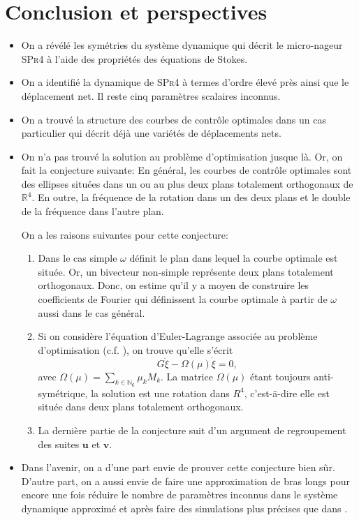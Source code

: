 \documentclass[12pt,a4paper]{article}
\theoremstyle{plain}
\theoremstyle{plain}
\theoremstyle{plain}
\theoremstyle{definition}
\theoremstyle{definition}
\theoremstyle{definition}
\theoremstyle{plain}
\newcommand{\N}{\mathbb{N}}
\newcommand{\R}{\mathbb{R}}
\begin{document}
\section{Conclusion et perspectives}
\begin{itemize}
\item On a révélé les symétries du système dynamique qui décrit le micro-nageur \textsc{SPr4} à l'aide des propriétés des équations de Stokes.

\item On a identifié la dynamique de \textsc{SPr4} à termes d'ordre élevé  près ainsi que le déplacement net. Il reste cinq paramètres scalaires inconnus.

\item On a trouvé la structure des courbes de contrôle optimales dans un cas particulier qui décrit déjà une variétés de déplacements nets.

\item On n'a pas trouvé la solution au problème d'optimisation jusque là. Or, on fait la conjecture suivante: En général, les courbes de contrôle optimales sont des ellipses situées dans un ou au plus deux plans totalement orthogonaux de $\R^4$. En outre, la fréquence de la rotation dans un des deux plans et le double de la fréquence dans l'autre plan.

On a les raisons suivantes pour cette conjecture:
\begin{enumerate}
\item Dans le cas simple $\omega$ définit le plan dans lequel la courbe optimale est située. Or, un bivecteur non-simple représente deux plans totalement orthogonaux. Donc, on estime qu'il y a moyen de construire les coefficients de Fourier qui définissent la courbe optimale à partir de $\omega$ aussi dans le cas général.

\item Si on considère l'équation d'Euler-Lagrange associée au problème d'optimisation (c.f. \cite{DeSimone2011}), on trouve qu'elle s'écrit
\begin{equation}
G \ddot{\xi} - \Omega(\mu) \dot{\xi} = 0,
\end{equation}
avec $\Omega(\mu) = \sum_{k \in \N_6} \mu_k M_k$. La matrice $\Omega(\mu)$ étant toujours anti-symétrique, la solution est une rotation dans $R^4$, c'est-ä-dire elle est située dans deux plans totalement orthogonaux.

\item La dernière partie de la conjecture suit d'un argument de regroupement des suites $\mathbf{u}$ et $\mathbf{v}$.
\end{enumerate}

\item Dans l'avenir, on a d'une part envie de prouver cette conjecture bien sûr. D'autre part, on a aussi envie de faire une approximation de bras longs pour encore une fois réduire le nombre de paramètres inconnus dans le système dynamique approximé et après faire des simulations plus précises que dans \cite{Alouges2013}.
\end{itemize}


\printbibliography
\end{document}
